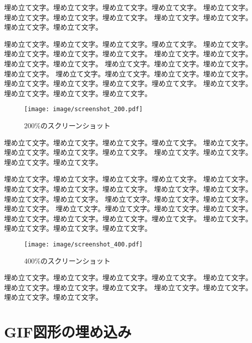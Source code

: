 埋め立て文字。埋め立て文字。埋め立て文字。埋め立て文字。
埋め立て文字。埋め立て文字。埋め立て文字。埋め立て文字。
埋め立て文字。埋め立て文字。埋め立て文字。埋め立て文字。

埋め立て文字。埋め立て文字。埋め立て文字。埋め立て文字。
埋め立て文字。埋め立て文字。埋め立て文字。埋め立て文字。
埋め立て文字。埋め立て文字。埋め立て文字。埋め立て文字。
埋め立て文字。埋め立て文字。埋め立て文字。埋め立て文字。
埋め立て文字。埋め立て文字。埋め立て文字。埋め立て文字。
埋め立て文字。埋め立て文字。埋め立て文字。埋め立て文字。
埋め立て文字。埋め立て文字。埋め立て文字。埋め立て文字。

\begin{wrapfigure}{r}[0pt]{0.5\textwidth}
    \begin{center}
        \fbox
        {\texttt{[image: image/screenshot\_200.pdf]}}
        \caption{200\%のスクリーンショット} \label{fig:sc200}
    \end{center}
\end{wrapfigure}


埋め立て文字。埋め立て文字。埋め立て文字。埋め立て文字。
埋め立て文字。埋め立て文字。埋め立て文字。埋め立て文字。
埋め立て文字。埋め立て文字。埋め立て文字。埋め立て文字。

埋め立て文字。埋め立て文字。埋め立て文字。埋め立て文字。
埋め立て文字。埋め立て文字。埋め立て文字。埋め立て文字。
埋め立て文字。埋め立て文字。埋め立て文字。埋め立て文字。
埋め立て文字。埋め立て文字。埋め立て文字。埋め立て文字。
埋め立て文字。埋め立て文字。埋め立て文字。埋め立て文字。
埋め立て文字。埋め立て文字。埋め立て文字。埋め立て文字。
埋め立て文字。埋め立て文字。埋め立て文字。埋め立て文字。

\begin{wrapfigure}{r}[0pt]{0.5\textwidth}
    \begin{center}
        \fbox
        {\texttt{[image: image/screenshot\_400.pdf]}}
        \caption{400\%のスクリーンショット} \label{fig:sc400}
    \end{center}
\end{wrapfigure}



埋め立て文字。埋め立て文字。埋め立て文字。埋め立て文字。
埋め立て文字。埋め立て文字。埋め立て文字。埋め立て文字。
埋め立て文字。埋め立て文字。埋め立て文字。埋め立て文字。





\section{GIF図形の埋め込み}

